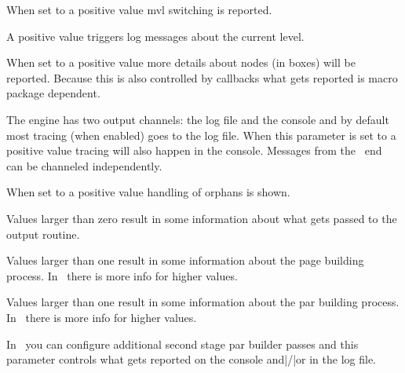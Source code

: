 When set to a positive value mvl switching is reported.

\stopnewprimitive

\startoldprimitive[title={\prm {tracingnesting}}]

A positive value triggers log messages about the current level.

\stopoldprimitive

\startnewprimitive[title={\prm {tracingnodes}}]

When set to a positive value more details about nodes (in boxes) will be
reported. Because this is also controlled by callbacks what gets reported is
macro package dependent.

\stopnewprimitive

\startoldprimitive[title={\prm {tracingonline}}]

The engine has two output channels: the log file and the console and by default
most tracing (when enabled) goes to the log file. When this parameter is set to a
positive value tracing will also happen in the console. Messages from the \LUA\
end can be channeled independently.

\stopoldprimitive

\startnewprimitive[title={\prm {tracingorphans}}]

When set to a positive value handling of orphans is shown.

\stopnewprimitive

\startoldprimitive[title={\prm {tracingoutput}}]

Values larger than zero result in some information about what gets passed to the
output routine.

\stopoldprimitive

\startoldprimitive[title={\prm {tracingpages}}]

Values larger than one result in some information about the page building
process. In \LUAMETATEX\ there is more info for higher values.

\stopoldprimitive

\startoldprimitive[title={\prm {tracingparagraphs}}]

Values larger than one result in some information about the par building process.
In \LUAMETATEX\ there is more info for higher values.

\stopoldprimitive

\startnewprimitive[title={\prm {tracingpasses}}]

In \LUAMETATEX\ you can configure additional second stage par builder passes and
this parameter controls what gets reported on the console and|/|or in the log
file.

